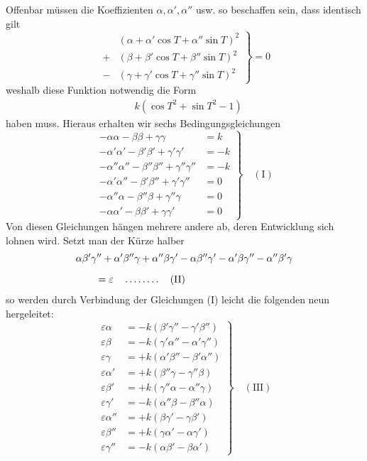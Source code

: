 Offenbar müssen die Koeffizienten $\alpha,\alpha',\alpha''$ usw. so beschaffen sein, dass identisch gilt
\[
\left.\begin{aligned}
 &(\alpha+\alpha'\cos T+\alpha''\sin T)^2\\[5pt]
+&(\beta+\beta'\cos T+\beta''\sin T)^2\\[5pt]
-&(\gamma+\gamma'\cos T+\gamma''\sin T)^2
\end{aligned}\right\}=0
\]
weshalb diese Funktion notwendig die Form
\[
\begin{aligned}
&k(\cos T^2+\sin T^2-1)
\end{aligned}
\]
haben muss. Hieraus erhalten wir sechs Bedingungsgleichungen
\[
\left.\begin{aligned}
-\alpha\alpha-\beta\beta+\gamma\gamma&=k\\[5pt]
-\alpha'\alpha'-\beta'\beta'+\gamma'\gamma'&=-k\\[5pt]
-\alpha''\alpha''-\beta''\beta''+\gamma''\gamma''&=-k\\[5pt]
-\alpha'\alpha''-\beta'\beta''+\gamma'\gamma''&=0\\[5pt]
-\alpha''\alpha-\beta''\beta+\gamma''\gamma&=0\\[5pt]
-\alpha\alpha'-\beta\beta'+\gamma\gamma'&=0
\end{aligned}\right\}\quad\mathrm{(I)}
\]
Von diesen Gleichungen hängen mehrere andere ab, deren Entwicklung sich lohnen wird. Setzt man der Kürze halber
\[
\begin{aligned}
&\alpha\beta'\gamma''+\alpha'\beta''\gamma+\alpha''\beta\gamma'
-\alpha\beta''\gamma'-\alpha'\beta\gamma''-\alpha''\beta'\gamma
\\[6pt]
&\qquad{}=\varepsilon\quad\mathinner{.\,.\,.\,.\,.\,.\,.\,.}\quad\text{(II)}
\end{aligned}
\]
so werden durch Verbindung der Gleichungen (I) leicht die folgenden neun hergeleitet:
\[
\left.\begin{aligned}
\varepsilon\alpha&=-k(\beta'\gamma''-\gamma'\beta'')\\[5pt]
\varepsilon\beta&=-k(\gamma'\alpha''-\alpha'\gamma'')\\[5pt]
\varepsilon\gamma&=+k(\alpha'\beta''-\beta'\alpha'')\\[5pt]
\varepsilon\alpha'&=+k(\beta''\gamma-\gamma''\beta)\\[5pt]
\varepsilon\beta'&=+k(\gamma''\alpha-\alpha''\gamma)\\[5pt]
\varepsilon\gamma'&=-k(\alpha''\beta-\beta''\alpha)\\[5pt]
\varepsilon\alpha''&=+k(\beta\gamma'-\gamma\beta')\\[5pt]
\varepsilon\beta''&=+k(\gamma\alpha'-\alpha\gamma')\\[5pt]
\varepsilon\gamma''&=-k(\alpha\beta'-\beta\alpha')
\end{aligned}\right\}\quad\mathrm{(III)}
\]
